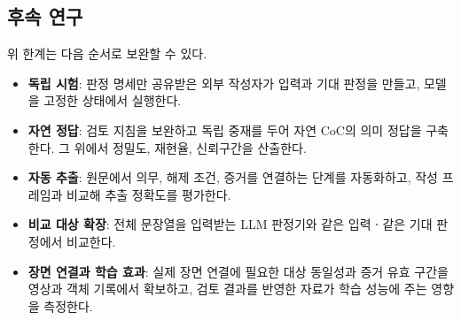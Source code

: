 \begin{revision}
\subsection{후속 연구}
\label{sec:future-work}
위 한계는 다음 순서로 보완할 수 있다.
\begin{itemize}
\item \textbf{독립 시험}: 판정 명세만 공유받은 외부 작성자가 입력과 기대 판정을 만들고, 모델을 고정한 상태에서 실행한다.
\item \textbf{자연 정답}: 검토 지침을 보완하고 독립 중재를 두어 자연 CoC의 의미 정답을 구축한다. 그 위에서 정밀도, 재현율, 신뢰구간을 산출한다.
\item \textbf{자동 추출}: 원문에서 의무, 해제 조건, 증거를 연결하는 단계를 자동화하고, 작성 프레임과 비교해 추출 정확도를 평가한다.
\item \textbf{비교 대상 확장}: 전체 문장열을 입력받는 LLM 판정기와 같은 입력ㆍ같은 기대 판정에서 비교한다.
\item \textbf{장면 연결과 학습 효과}: 실제 장면 연결에 필요한 대상 동일성과 증거 유효 구간을 영상과 객체 기록에서 확보하고, 검토 결과를 반영한 자료가 학습 성능에 주는 영향을 측정한다.
\end{itemize}
\end{revision}
